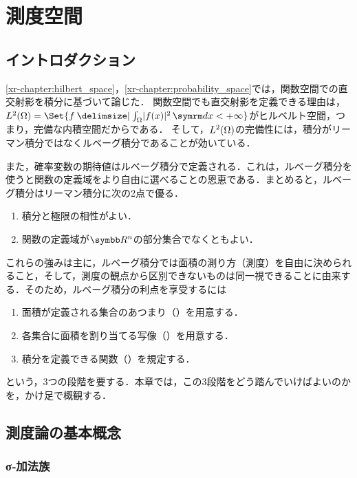 \documentclass[../../main]{subfiles}
\begin{document}
\chapter{測度空間}
\label{appendix:measure_space}

\section{イントロダクション}

\cref{xr-chapter:hilbert_space}，\cref{xr-chapter:probability_space}では，関数空間での直交射影を積分に基づいて論じた．
関数空間でも直交射影を定義できる理由は，\(\Lebesgue{2}(\Omega)=\Set{f\given\int_\Omega\abs{f(x)}^2\intd{x}<+\infty}\)がヒルベルト空間，つまり，完備な内積空間だからである．
そして，\(\Lebesgue{2}(\Omega)\)の完備性には，積分がリーマン積分ではなくルベーグ積分であることが効いている．

また，確率変数の期待値はルベーグ積分で定義される．これは，ルベーグ積分を使うと関数の定義域をより自由に選べることの恩恵である．まとめると，ルベーグ積分はリーマン積分に次の2点で優る．
\begin{enumerate}
  \item 積分と極限の相性がよい．
  \item 関数の定義域が\(\numset{R}^n\)の部分集合でなくともよい．
\end{enumerate}

これらの強みは主に，ルベーグ積分では面積の測り方（測度）を自由に決められること，そして，測度の観点から区別できないものは同一視できることに由来する．そのため，ルベーグ積分の利点を享受するには
\begin{enumerate}
  \item 面積が定義される集合のあつまり（）を用意する．
  \item 各集合に面積を割り当てる写像（）を用意する．
  \item 積分を定義できる関数（）を規定する．
\end{enumerate}
という，3つの段階を要する．本章では，この3段階をどう踏んでいけばよいのかを，かけ足で概観する．

\section{測度論の基本概念}

\subsection{σ‐加法族}
\end{document}
